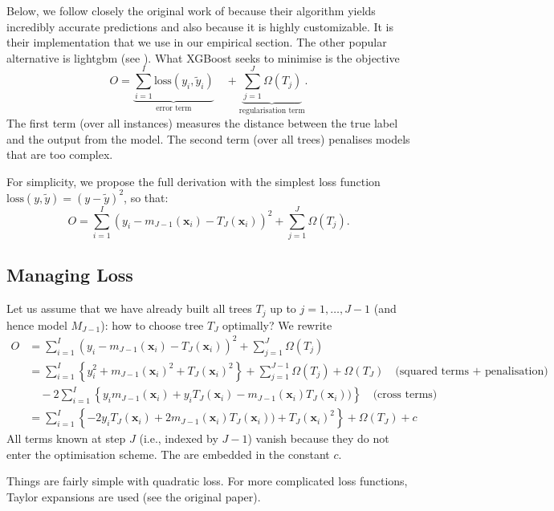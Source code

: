 \documentclass[]{krantz}
\theoremstyle{definition}
\theoremstyle{definition}
\theoremstyle{definition}
\theoremstyle{remark}
\begin{document}
Below, we follow closely the original work of \citet{chen2016xgboost}
because their algorithm yields incredibly accurate predictions and also
because it is highly customizable. It is their implementation that we
use in our empirical section. The other popular alternative is lightgbm
(see \citet{ke2017lightgbm}). What XGBoost seeks to minimise is the
objective
\[O=\underbrace{\sum_{i=1}^I \text{loss}(y_i,\tilde{y}_i)}_{\text{error term}} \quad + \underbrace{\sum_{j=1}^J\Omega(T_j)}_{\text{regularisation term}}.\]
The first term (over all instances) measures the distance between the
true label and the output from the model. The second term (over all
trees) penalises models that are too complex.

For simplicity, we propose the full derivation with the simplest loss
function \(\text{loss}(y,\tilde{y})=(y-\tilde{y})^2\), so that:
\[O=\sum_{i=1}^I \left(y_i-m_{J-1}(\mathbf{x}_i)-T_J(\mathbf{x}_i)\right)^2+ \sum_{j=1}^J\Omega(T_j).\]

\hypertarget{managing-loss}{%
\subsection{Managing Loss}\label{managing-loss}}

Let us assume that we have already built all trees \(T_{j}\) up to
\(j=1,\dots,J-1\) (and hence model \(M_{J-1}\)): how to choose tree
\(T_J\) optimally? We rewrite \begin{align*}
O&=\sum_{i=1}^I \left(y_i-m_{J-1}(\mathbf{x}_i)-T_J(\mathbf{x}_i)\right)^2+ \sum_{j=1}^J\Omega(T_j) \\
&=\sum_{i=1}^I\left\{y_i^2+m_{J-1}(\mathbf{x}_i)^2+T_J(\mathbf{x}_i)^2 \right\} + \sum_{j=1}^{J-1}\Omega(T_j)+\Omega(T_J) \quad \text{(squared terms + penalisation)}\\
& \quad -2 \sum_{i=1}^I\left\{y_im_{J-1}(\mathbf{x}_i)+y_iT_J(\mathbf{x}_i)-m_{J-1}(\mathbf{x}_i) T_J(\mathbf{x}_i))\right\}\quad \text{(cross terms)} \\
&= \sum_{i=1}^I\left\{-2 y_iT_J(\mathbf{x}_i)+2m_{J-1}(\mathbf{x}_i) T_J(\mathbf{x}_i))+T_J(\mathbf{x}_i)^2 \right\} +\Omega(T_J) + c
\end{align*} All terms known at step \(J\) (i.e., indexed by \(J-1\))
vanish because they do not enter the optimisation scheme. The are
embedded in the constant \(c\).

Things are fairly simple with quadratic loss. For more complicated loss
functions, Taylor expansions are used (see the original paper).
\end{document}
